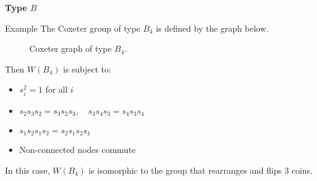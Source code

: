 \documentclass[9pt,handout]{beamer}
\newcommand{\<}{\langle}
\renewcommand{\>}{\rangle}
\DeclareMathOperator{\Sym}{Sym}
\begin{document}
\begin{frame}{\textbf{Type $B$}}\pause

\begin{block}{Example}
The Coxeter group of type $B_4$ is defined by the graph below.
\begin{figure}
\caption{Coxeter graph of type $B_4$.}
\end{figure}
\vspace{-1em}
\pause Then $W(B_{4})$ is subject to: \pause 
\begin{itemize}
\item $s_{i}^{2}=1$ for all $i$ \pause
\item $s_{2}s_{3}s_{2}=s_{3}s_{2}s_{3}, \quad s_{3}s_{4}s_{3}=s_{4}s_{3}s_{4}$ \pause 
\item $s_{1}s_{2}s_{1}s_{2}=s_{2}s_{1}s_{2}s_{1}$ \pause
\item Non-connected nodes commute
\end{itemize}

\pause
\medskip

In this case, $W(B_4)$ is isomorphic to the group that rearranges and flips 3 coins. %
\end{block}

\end{frame}

\end{document}
